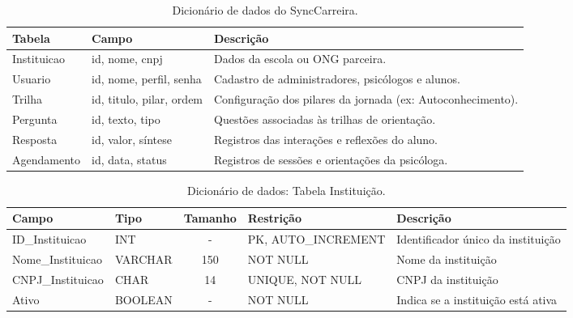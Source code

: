 \begin{table}[htb]
\ABNTEXfontereduzida
\caption[Dicionário de Dados do SyncCarreira]{Dicionário de dados do SyncCarreira.}
\label{tab-dicionario}
\begin{tabular}{p{2.5cm}|p{4cm}|p{7.5cm}}
\textbf{Tabela} & \textbf{Campo} & \textbf{Descrição} \\
\hline
Instituicao & id, nome, cnpj & Dados da escola ou ONG parceira. \\
\hline
Usuario & id, nome, perfil, senha & Cadastro de administradores, psicólogos e alunos. \\
\hline
Trilha & id, titulo, pilar, ordem & Configuração dos pilares da jornada (ex: Autoconhecimento). \\
\hline
Pergunta & id, texto, tipo & Questões associadas às trilhas de orientação. \\
\hline
Resposta & id, valor, síntese & Registros das interações e reflexões do aluno. \\
\hline
Agendamento & id, data, status & Registros de sessões e orientações da psicóloga. \\
\end{tabular}
\end{table}

\begin{table}[H]
    \centering
    \ABNTEXfontereduzida
    \caption[Dicionário de Dados - Tabela Instituição]{Dicionário de dados: Tabela Instituição.}
    \label{tab-tb-instituicao}
    \begin{tabular}{p{3.5cm}|p{2cm}|c|p{3.5cm}|p{4cm}}
    \textbf{Campo} & \textbf{Tipo} & \textbf{Tamanho} & \textbf{Restrição} & \textbf{Descrição} \\
    \hline
    ID\_Instituicao & INT & - & PK, AUTO\_INCREMENT & Identificador único da instituição \\
    \hline
    Nome\_Instituicao & VARCHAR & 150 & NOT NULL & Nome da instituição \\
    \hline
    CNPJ\_Instituicao & CHAR & 14 & UNIQUE, NOT NULL & CNPJ da instituição \\
    \hline
    Ativo & BOOLEAN & - & NOT NULL & Indica se a instituição está ativa \\
    \end{tabular}
\end{table}

